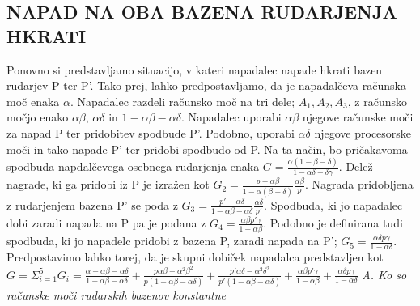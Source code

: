 \documentclass{acm_proc_article-sp}
\begin{document}
\subsection{NAPAD NA OBA BAZENA RUDARJENJA HKRATI}
Ponovno si predstavljamo situacijo, v kateri napadalec napade hkrati bazen rudarjev P ter P'. Tako prej, lahko predpostavljamo, da je napadalčeva računska moč enaka $\alpha$. Napadalec razdeli računsko moč na tri dele; $A_1, A_2, A_3$, z računsko močjo enako $\alpha\beta$, $\alpha\delta$ in $1 - \alpha\beta - \alpha\delta$. Napadalec uporabi $\alpha\beta$ njegove računske moči za napad P ter pridobitev spodbude P'. Podobno, uporabi $\alpha\delta$ njegove procesorske moči in tako napade P' ter pridobi spodbudo od P. Na ta način, bo pričakavoma spodbuda napdalčevega osebnega rudarjenja enaka $ G = \frac{\alpha(1 - \beta - \delta)}{1 - \alpha\delta - \delta\gamma}$. Delež nagrade, ki ga pridobi iz P je izražen kot $G_2 = \frac{p - \alpha\beta}{1 - \alpha(\beta + \delta)} \frac{\alpha\beta}{p}$. Nagrada pridobljena z rudarjenjem bazena P' se poda z $G_3 = \frac{p' - \alpha\delta}{1 - \alpha\beta - \alpha\delta} \frac{\alpha\delta}{p'}$. Spodbuda, ki jo napadalec dobi zaradi napada na P pa je podana z $G_4 = \frac{\alpha\beta p' \gamma}{1 - \alpha\beta}$. Podobno je definirana tudi spodbuda, ki jo napadelc pridobi z bazena P, zaradi napada na P'; $G_5 = \frac{\alpha\delta p \gamma}{1 - \alpha\delta}$. Predpostavimo lahko torej, da je skupni dobiček napadalca predstavljen kot $G = \Sigma_{i=1}^5 G_i = \frac{\alpha - \alpha\beta - \alpha\delta}{1 - \alpha\beta - \alpha\delta} + \frac{p \alpha\beta - \alpha^2\beta^2}{p(1 - \alpha\beta - \alpha\delta)} + \frac{p' \alpha\delta - \alpha^2\delta^2}{p'(1 - \alpha\beta - \alpha\delta)} + \frac{\alpha\beta p' \gamma}{1 - \alpha\beta} + \frac{\alpha\delta p \gamma}{1 - \alpha\delta}$
\newline
\newline
\textit{A. Ko so računske moči rudarskih bazenov konstantne}
\end{document}
